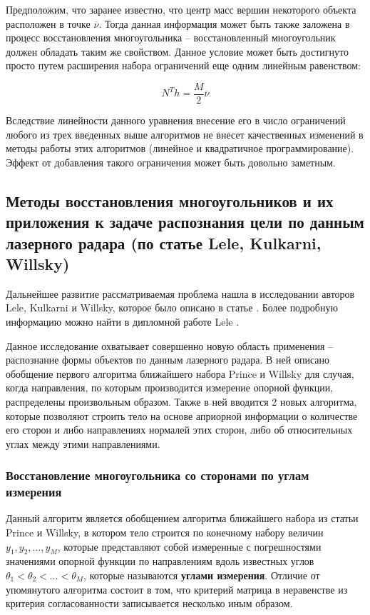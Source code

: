 \documentclass[a4paper,12pt, titlepage]{article}
\begin{document}
Предположим, что заранее известно, что центр масс вершин некоторого объекта
расположен в точке $\overline{\nu}$. Тогда данная информация может быть также
заложена в процесс восстановления многоугольника -- восстановленный
многоугольник должен обладать таким же свойством. Данное условие может быть
достигнуто просто путем расширения набора ограничений еще одним линейным
равенством:

$$
N^{T} h = \frac{M}{2} \overline{\nu}
$$

Вследствие линейности данного уравнения внесение его в число ограничений любого
из трех введенных выше алгоритмов не внесет качественных изменений в методы
работы этих алгоритмов (линейное и квадратичное программирование). Эффект от
добавления такого ограничения может быть довольно заметным.

\newpage
\subsection{Методы восстановления многоугольников и их приложения к
задаче распознания цели по данным лазерного радара (по статье Lele, Kulkarni,
Willsky)}

Дальнейшее развитие рассматриваемая проблема нашла в исследовании авторов Lele,
Kulkarni и Willsky, которое было описано в статье
\cite{journals/josaa/LeleKW92}. Более подробную информацию можно найти в
дипломной работе Lele \cite{thesis/Lele90}.

Данное исследование охватывает совершенно новую область применения --
распознание формы объектов по данным лазерного радара. В ней описано обобщение
первого алгоритма ближайшего набора Prince и Willsky для случая, когда
направления, по которым производится измерение опорной функции, распределены
произвольным образом. Также в ней вводится 2 новых алгоритма, которые позволяют
строить тело на основе априорной информации о количестве его сторон и
либо направлениях нормалей этих сторон, либо об относительных углах между этими
направлениями.

\subsubsection{Восстановление многоугольника со сторонами по углам измерения}

Данный алгоритм является обобщением алгоритма ближайшего набора из статьи Prince
и Willsky, в котором тело строится по конечному набору величин
$y_{1}, y_{2}, \ldots, y_{M}$,  которые представляют собой измеренные с
погрешностями значениями опорной функции по направлениям вдоль известных углов
$\theta_{1} < \theta_{2} < \ldots < \theta_{M}$, которые называются
\textbf{углами измерения}. Отличие от упомянутого алгоритма состоит в том, что
критерий матрица в неравенстве из критерия согласованности записывается
несколько иным образом.
\end{document}
